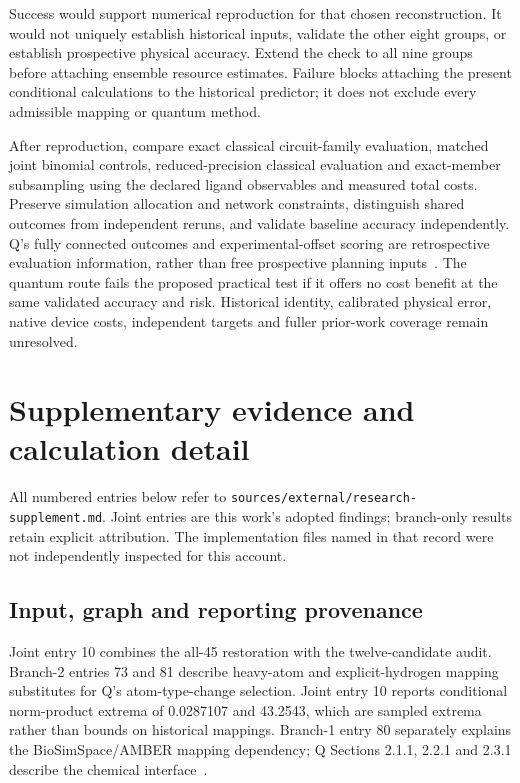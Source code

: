 \documentclass{article}
\begin{document}
Success would support numerical reproduction for that chosen reconstruction. It would not uniquely establish historical inputs, validate the other eight groups, or establish prospective physical accuracy. Extend the check to all nine groups before attaching ensemble resource estimates. Failure blocks attaching the present conditional calculations to the historical predictor; it does not exclude every admissible mapping or quantum method.

After reproduction, compare exact classical circuit-family evaluation, matched joint binomial controls, reduced-precision classical evaluation and exact-member subsampling using the declared ligand observables and measured total costs. Preserve simulation allocation and network constraints, distinguish shared outcomes from independent reruns, and validate baseline accuracy independently. Q's fully connected outcomes and experimental-offset scoring are retrospective evaluation information, rather than free prospective planning inputs~\cite{Q}. The quantum route fails the proposed practical test if it offers no cost benefit at the same validated accuracy and risk. Historical identity, calibrated physical error, native device costs, independent targets and fuller prior-work coverage remain unresolved.

\appendix
\section{Supplementary evidence and calculation detail}

All numbered entries below refer to \texttt{sources/external/research-supplement.md}. Joint entries are this work's adopted findings; branch-only results retain explicit attribution. The implementation files named in that record were not independently inspected for this account.

\subsection{Input, graph and reporting provenance}

Joint entry 10 combines the all-45 restoration with the twelve-candidate audit. Branch-2 entries 73 and 81 describe heavy-atom and explicit-hydrogen mapping substitutes for Q's atom-type-change selection. Joint entry 10 reports conditional norm-product extrema of 0.0287107 and 43.2543, which are sampled extrema rather than bounds on historical mappings. Branch-1 entry 80 separately explains the BioSimSpace/AMBER mapping dependency; Q Sections 2.1.1, 2.2.1 and 2.3.1 describe the chemical interface~\cite{Q}.
\end{document}
